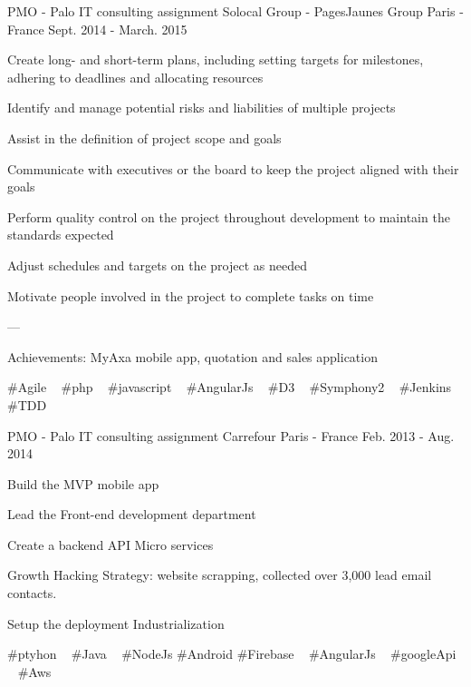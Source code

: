 \begin{cventries}
  \cventry
    {PMO - Palo IT consulting assignment} %
    {Solocal Group - PagesJaunes Group} %
    {Paris - France} %
    {Sept. 2014 - March. 2015} %
    {
      \begin{cvitems} %
        \item {Create long- and short-term plans, including setting targets for milestones, adhering to deadlines and allocating resources}
        \item {Identify and manage potential risks and liabilities of multiple projects}
        \item {Assist in the definition of project scope and goals}
        \item {Communicate with executives or the board to keep the project aligned with their goals}
        \item {Perform quality control on the project throughout development to maintain the standards expected}
        \item {Adjust schedules and targets on the project as needed}
        \item {Motivate people involved in the project to complete tasks on time}
        \item {---}
        \item {Achievements: MyAxa mobile app, quotation and sales application}
      \end{cvitems}
    }
    {
      \#Agile ~
      \#php ~
      \#javascript ~
      \#AngularJs ~
      \#D3 ~
      \#Symphony2 ~
      \#Jenkins ~
      \#TDD
    }

  \cventry
    {PMO - Palo IT consulting assignment} %
    {Carrefour} %
    {Paris - France} %
    {Feb. 2013 - Aug. 2014} %
    {
      \begin{cvitems} %
        \item {Build the MVP mobile app}
        \item {Lead the Front-end development department}
        \item {Create a backend API Micro services}
        \item {Growth Hacking Strategy: website scrapping, collected over 3,000 lead email contacts.}
        \item {Setup the deployment Industrialization}
      \end{cvitems}
    }
    {
      \#ptyhon ~
      \#Java ~
      \#NodeJs
      \#Android
      \#Firebase ~
      \#AngularJs ~
      \#googleApi ~
      \#Aws ~
    }


\end{cventries}
